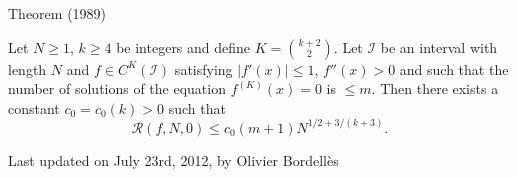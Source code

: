 \begin{thm}{Theorem (1989)}

Let $N \geqslant 1$, $k \geqslant 4$ be integers and define $K = \binom{k+2}{2}$. Let $\mathcal{I}$ be an interval with length $N$ and $f \in C^K (\mathcal{I})$ satisfying $|f'(x)| \leqslant 1$, $f''(x) >0$ and such that the number of solutions of the equation $f^{(K)} (x) = 0$ is $\leqslant m$. Then there exists a constant $c_0 = c_0(k) >0$ such that
$$\mathcal {R}(f,N,0) \leqslant c_0 (m+1) N^{1/2+3/(k+3)}.$$
\end{thm}











  
  Last updated on July 23rd, 2012, by Olivier Bordell\`es
















